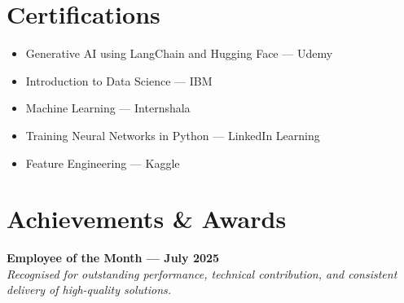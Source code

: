 \documentclass[10pt, letterpaper]{article}
\newcommand{\resumeItem}[1]{%
  \item\small{#1}
}
\begin{document}
\vspace{-2pt}

\section{Certifications}

\begin{itemize}
  \resumeItem{Generative AI using LangChain and Hugging Face --- Udemy}
  \resumeItem{Introduction to Data Science --- IBM}
  \resumeItem{Machine Learning --- Internshala}
  \resumeItem{Training Neural Networks in Python --- LinkedIn Learning}
  \resumeItem{Feature Engineering --- Kaggle}
\end{itemize}

\vspace{-2pt}

\section{Achievements \& Awards}

\textbf{Employee of the Month --- July 2025} \\
\textit{Recognised for outstanding performance, technical contribution, and consistent delivery of high-quality solutions.}
\end{document}
